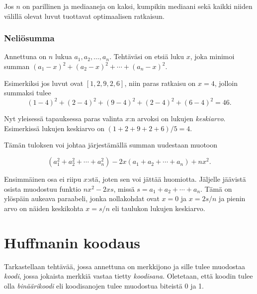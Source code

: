 Jos $n$ on parillinen ja mediaaneja on kaksi,
kumpikin mediaani sekä kaikki niiden välillä
olevat luvut tuottavat optimaalisen ratkaisun.

\subsubsection{Neliösumma}

\begin{task}
Annettuna on $n$ lukua $a_1,a_2,\ldots,a_n$.
Tehtäväsi on etsiä luku $x$, joka minimoi summan
$(a_1-x)^2+(a_2-x)^2+\cdots+(a_n-x)^2.$
\end{task}

Esimerkiksi jos luvut ovat $[1,2,9,2,6]$,
niin paras ratkaisu on $x=4$,
jolloin summaksi tulee
\[
(1-4)^2+(2-4)^2+(9-4)^2+(2-4)^2+(6-4)^2=46.
\]

\noindent
Nyt yleisessä tapauksessa
paras valinta $x$:n arvoksi on lukujen
\textit{keskiarvo}.
Esimerkissä lukujen keskiarvo on $(1+2+9+2+6)/5=4$.

Tämän tuloksen voi johtaa järjestämällä summan
uudestaan muotoon

\[
(a_1^2+a_2^2+\cdots+a_n^2)-2x(a_1+a_2+\cdots+a_n)+nx^2.
\]

Ensimmäinen osa ei riipu $x$:stä, joten sen voi jättää huomiotta.
Jäljelle jäävistä osista muodostuu funktio
$nx^2-2xs$, missä $s=a_1+a_2+\cdots+a_n$.
Tämä on ylöspäin aukeava paraabeli,
jonka nollakohdat ovat $x=0$ ja $x=2s/n$
ja pienin arvo on näiden keskikohta
$x=s/n$ eli taulukon lukujen keskiarvo.

\section{Huffmanin koodaus}


Tarkastellaan tehtävää, jossa annettuna on merkkijono ja
sille tulee muodostaa \textit{koodi},
jossa jokaista merkkiä vastaa tietty \textit{koodisana}.
Oletetaan, että koodin tulee olla \textit{binäärikoodi}
eli koodisanojen tulee muodostua biteistä 0 ja 1.


